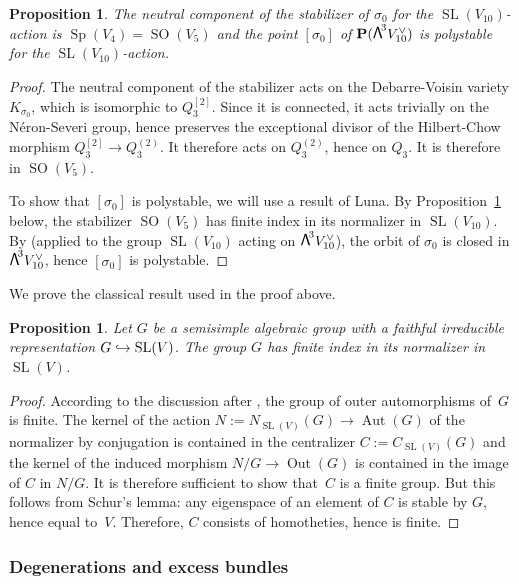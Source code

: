 \documentclass[JEP,XML,SOM,Unicode, NoEqCountersInSection,NoFloatCountersInSection]{cedram}
\newcommand\hto{\mathrel{\lhook\joinrel\to}}
\newtheorem{prop}[lemm]{Proposition}
\theoremstyle{definition}
\renewcommand\P{{\mathbf P}}\let\PP\P
\DeclareMathOperator{\Aut}{Aut}
\DeclareMathOperator{\Out}{Out}
\DeclareMathOperator{\SO}{SO}
\DeclareMathOperator{\Sp}{Sp}
\DeclareMathOperator{\SL}{SL}
\newcommand\bw[1]{{\hbox{\large$\mathsf{\Lambda}$}^{\!#1}}}
\newcommand\Qtrois{{Q_3}}
\newcommand\hilb{{Q_3^{[2]}}}
\newcommand\chow{{Q_3^{(2)}}}
\begin{document}
\begin{prop}\label{coronouveau}
The neutral component of the stabilizer of $\sigma_0$ for the $\SL(V_{10})$-action is $\Sp(V_4)=\SO(V_5)$ and the point $[\sigma_0]$ of $\P(\bw3V_{10}^\vee)$ is polystable for the $\SL(V_{10})$-action.
\end{prop}

\begin{proof}
The neutral component of the stabilizer acts on the Debarre-Voisin variety $K_{\sigma_0}$, which is isomorphic to $\hilb$. Since it is connected, it acts trivially on the Néron-Severi group, hence preserves the exceptional divisor of the Hilbert-Chow morphism $\hilb\to \chow$. It therefore acts on $\chow$, hence on $\Qtrois$. It is therefore in $\SO(V_5)$.

To show that $[\sigma_0]$ is polystable, we will use a result of Luna. By Proposition~\ref{normal} below, the stabilizer $\SO(V_5)$ has finite index in its normalizer in
$\SL(V_{10})$. By
\cite[Cor.\,3]{luna} (applied to the group $ \SL(V_{10})$ acting on $\bw3V_{10}^\vee $), the orbit of $\sigma_0$ is closed in $\bw3V_{10}^\vee $, hence $[\sigma_0]$ is polystable.
\end{proof}

We prove the classical result used in the proof above.

\begin{prop}\label{normal}
Let $G$ be a semisimple algebraic group with a faithful irreducible representation $G\hto \SL(V)$. The group $G$ has finite index in its normalizer in $\SL(V)$.
\end{prop}

\begin{proof}
According to the discussion after \cite[Lem.\,16.3.8]{spring}, the group of outer automorphisms of~$G$ is finite. The kernel of the action $N:=N_{\SL(V)}(G)\to \Aut(G)$ of the normalizer by conjugation is contained in the centralizer $C:=C_{\SL(V)}(G)$ and the kernel of the induced morphism \mbox{$N/G\to \Out(G)$} is contained in the image of $C$ in $N/G$. It is therefore sufficient to show that~$C$ is a finite group. But this follows from Schur's lemma: any eigenspace of an element of $C$ is stable by $G$, hence equal to~$V$. Therefore, $C$ consists of homotheties, hence is finite.
\end{proof}

\subsubsection{Degenerations and excess bundles}\label{seconepartohivert}
\end{document}
